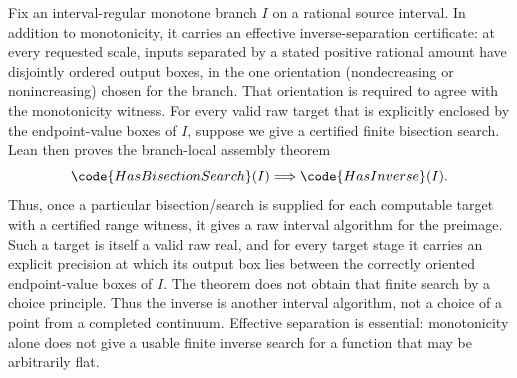 \begin{theorem}
\label{thm:constructive-inverse-function}
Fix an interval-regular monotone branch \(I\) on a rational source interval.
In addition to monotonicity, it carries an effective inverse-separation
certificate: at every requested scale, inputs separated by a stated positive
rational amount have disjointly ordered output boxes, in the one orientation
(nondecreasing or nonincreasing) chosen for the branch.  That orientation is
required to agree with the monotonicity witness.  For every valid raw target
that is explicitly enclosed by the endpoint-value boxes of \(I\), suppose we
give a certified finite bisection search.  Lean then proves the branch-local
assembly theorem
\[
  \code{HasBisectionSearch}(I)
  \Longrightarrow \code{HasInverse}(I).
\]
Thus, once a particular bisection/search is supplied for each computable
target with a certified range witness, it gives a raw interval algorithm for
the preimage.  Such a target is itself a valid raw real, and for every target
stage it carries an explicit precision at which its output box lies between the
correctly oriented endpoint-value boxes of \(I\).  The theorem does not obtain
that finite search by a choice principle.
Thus the inverse is another interval algorithm, not a choice of a point from
a completed continuum.  Effective separation is essential: monotonicity alone
does not give a usable finite inverse search for a function that may be
arbitrarily flat.
\end{theorem}

